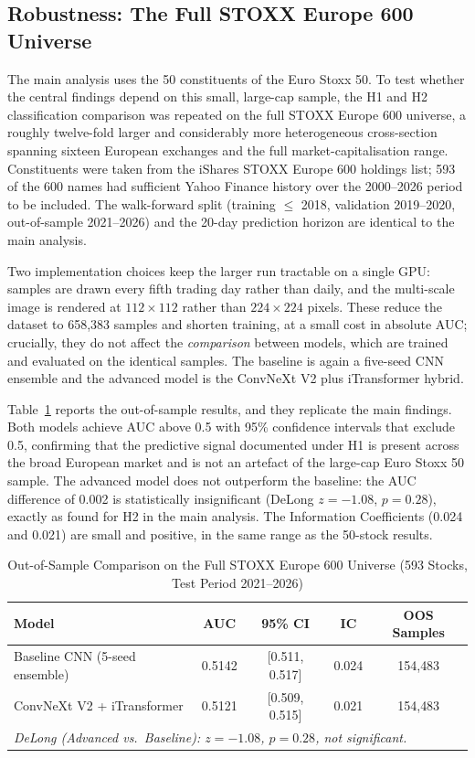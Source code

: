 \subsection{Robustness: The Full STOXX Europe 600 Universe}
\label{sec:res_stoxx600}

The main analysis uses the 50 constituents of the Euro Stoxx 50. To test
whether the central findings depend on this small, large-cap sample, the H1
and H2 classification comparison was repeated on the full STOXX Europe 600
universe, a roughly twelve-fold larger and considerably more heterogeneous
cross-section spanning sixteen European exchanges and the full
market-capitalisation range. Constituents were taken from the iShares STOXX
Europe 600 holdings list; 593 of the 600 names had sufficient Yahoo Finance
history over the 2000--2026 period to be included. The walk-forward split
(training $\leq$ 2018, validation 2019--2020, out-of-sample 2021--2026) and
the 20-day prediction horizon are identical to the main analysis.

Two implementation choices keep the larger run tractable on a single GPU:
samples are drawn every fifth trading day rather than daily, and the
multi-scale image is rendered at $112 \times 112$ rather than
$224 \times 224$ pixels. These reduce the dataset to 658{,}383 samples and
shorten training, at a small cost in absolute AUC; crucially, they do not
affect the \emph{comparison} between models, which are trained and evaluated
on the identical samples. The baseline is again a five-seed CNN ensemble and
the advanced model is the ConvNeXt V2 plus iTransformer hybrid.

Table~\ref{tab:stoxx600} reports the out-of-sample results, and they
replicate the main findings. Both models achieve AUC above 0.5 with 95\%
confidence intervals that exclude 0.5, confirming that the predictive signal
documented under H1 is present across the broad European market and is not an
artefact of the large-cap Euro Stoxx 50 sample. The advanced model does not
outperform the baseline: the AUC difference of 0.002 is statistically
insignificant (DeLong $z = -1.08$, $p = 0.28$), exactly as found for H2 in
the main analysis. The Information Coefficients (0.024 and 0.021) are small
and positive, in the same range as the 50-stock results.

\begin{table}[H]
\centering
\caption{Out-of-Sample Comparison on the Full STOXX Europe 600 Universe
(593 Stocks, Test Period 2021--2026)}
\label{tab:stoxx600}
\small
\begin{tabular}{lcccc}
\toprule
\textbf{Model} & \textbf{AUC} & \textbf{95\% CI} & \textbf{IC} & \textbf{OOS Samples} \\
\midrule
Baseline CNN (5-seed ensemble)   & 0.5142 & [0.511, 0.517] & 0.024 & 154{,}483 \\
ConvNeXt V2 + iTransformer        & 0.5121 & [0.509, 0.515] & 0.021 & 154{,}483 \\
\midrule
\multicolumn{5}{l}{\textit{DeLong (Advanced vs.\ Baseline): $z = -1.08$,
$p = 0.28$, not significant.}} \\
\bottomrule
\end{tabular}
\end{table}

